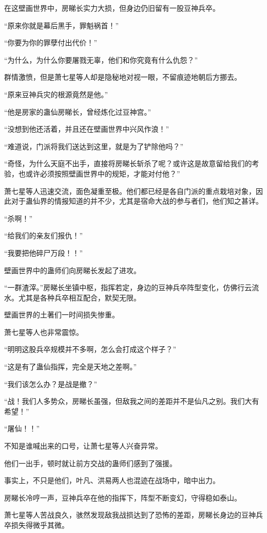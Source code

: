 \begin{this_body}
在这壁画世界中，房睇长实力大损，但身边仍旧留有一股豆神兵卒。

“原来你就是幕后黑手，罪魁祸首！”

“你要为你的罪孽付出代价！”

“为什么，为什么你要屠戮无辜，他们和你究竟有什么仇怨？”

群情激愤，但是萧七星等人却是隐秘地对视一眼，不留痕迹地朝后方挪去。

“原来豆神兵灾的根源竟然是他。”

“他是房家的蛊仙房睇长，曾经炼化过豆神宫。”

“没想到他还活着，并且还在壁画世界中兴风作浪！”

“难道说，门派将我们送达到这里，就是为了铲除他吗？”

“奇怪，为什么天庭不出手，直接将房睇长斩杀了呢？或许这是故意留给我们的考验，也或许必须按照壁画世界中的规矩，才能对付他？”

萧七星等人迅速交流，面色凝重至极。他们都已经是各自门派的重点栽培对象，因此对于蛊仙界的情报知道的并不少，尤其是宿命大战的参与者们，他们知之甚详。

“杀啊！”

“给我们的亲友们报仇！”

“我要把他碎尸万段！！”

壁画世界中的蛊师们向房睇长发起了进攻。

“一群渣滓。”房睇长坐镇中枢，指挥若定，身边的豆神兵卒阵型变化，仿佛行云流水。尤其是各种兵卒相互配合，默契无限。

壁画世界的土著们一时间损失惨重。

萧七星等人也非常震惊。

“明明这股兵卒规模并不多啊，怎么会打成这个样子？”

“这是有了蛊仙指挥，完全是天地之差啊。”

“我们该怎么办？是战是撤？”

“战！我们人多势众，房睇长虽强，但敌我之间的差距并不是仙凡之别。我们大有希望！”

“屠仙！！”

不知是谁喊出来的口号，让萧七星等人兴奋异常。

他们一出手，顿时就让前方交战的蛊师们感到了强援。

事实上，不只是他们，叶凡、洪易两人也混迹在战场中，暗中出力。

房睇长冷哼一声，豆神兵卒在他的指挥下，阵型不断变幻，守得稳如泰山。

萧七星等人苦战良久，骇然发现敌我战损达到了恐怖的差距，房睇长身边的豆神兵卒损失得微乎其微。


\end{this_body}
